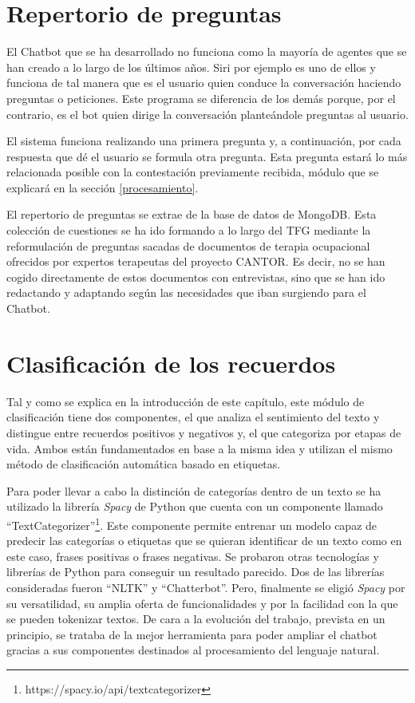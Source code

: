 \section {Repertorio de preguntas} \label{rep_preguntas}

El Chatbot que se ha desarrollado no funciona como la mayoría de agentes que se han creado a lo largo de los últimos años. Siri por ejemplo es uno de ellos y funciona de tal manera que es el usuario quien conduce la conversación haciendo preguntas o peticiones. Este programa se diferencia de los demás porque, por el contrario, es el bot quien dirige la conversación planteándole preguntas al usuario. 

El sistema funciona realizando una primera pregunta y, a continuación, por cada respuesta que dé el usuario se formula otra pregunta. Esta pregunta estará lo más relacionada posible con la contestación previamente recibida, módulo que se explicará en la sección \ref{procesamiento}. 

El repertorio de preguntas se extrae de la base de datos de MongoDB. Esta colección de cuestiones se ha ido formando a lo largo del TFG mediante la reformulación de preguntas sacadas de documentos de terapia ocupacional ofrecidos por expertos terapeutas del proyecto CANTOR. Es decir, no se han cogido directamente de estos documentos con entrevistas, sino que se han ido redactando y adaptando según las necesidades que iban surgiendo para el Chatbot. 

\section{Clasificación de los recuerdos} \label{clasificacion_rec}

Tal y como se explica en la introducción de este capítulo, este módulo de clasificación tiene dos componentes, el que analiza el sentimiento del texto y distingue entre recuerdos positivos y negativos y, el que categoriza por etapas de vida. Ambos están fundamentados en base a la misma idea y utilizan el mismo método de clasificación automática basado en etiquetas.

Para poder llevar a cabo la distinción de categorías dentro de un texto se ha utilizado la librería \textit{Spacy} de Python que cuenta con un componente llamado ``TextCategorizer''\footnote{https://spacy.io/api/textcategorizer}. Este componente permite entrenar un modelo capaz de predecir las categorías o etiquetas que se quieran identificar de un texto como en este caso, frases positivas o frases negativas. Se probaron otras tecnologías y librerías de Python para conseguir un resultado parecido. Dos de las librerías consideradas fueron ``NLTK'' y ``Chatterbot''. Pero, finalmente se eligió \textit{Spacy} por su versatilidad, su amplia oferta de funcionalidades y por la facilidad con la que se pueden tokenizar textos. De cara a la evolución del trabajo, prevista en un principio, se trataba de la mejor herramienta para poder ampliar el chatbot gracias a sus componentes destinados al procesamiento del lenguaje natural. 


